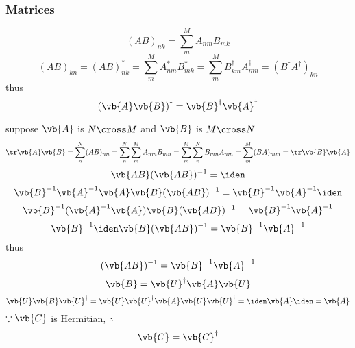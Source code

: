 \documentclass[a4paper]{article}
\begin{document}
\subsubsection{Matrices}
\begin{equation}\label{key}
(AB)_{nk} = \sum_m^M A_{nm}B_{mk}
\end{equation}
\begin{equation}\label{key}
(AB)^\dagger_{kn} = (AB)_{nk}^* = \sum_m^M A_{nm}^*B_{mk}^* = \sum_m^M B^\dagger_{km} A^\dagger_{mn} = (B^\dagger A^\dagger)_{kn}
\end{equation}
thus
\begin{equation}\label{key}
(\vb{A}\vb{B})^\dagger = \vb{B}^\dagger \vb{A}^\dagger
\end{equation}

suppose $ \vb{A} $ is $ N\cross M $ and $ \vb{B} $ is $ M\cross N $
\begin{equation}\label{key}
\tr \vb{A}\vb{B} = \sum_n^N (AB)_{nn} = \sum_n^N \sum_m^M A_{nm}B_{mn} = \sum_m^M\sum_n^N  B_{mn}A_{nm} = \sum_m^M (BA)_{mm} = \tr \vb{B}\vb{A}
\end{equation}
\begin{equation}\label{key}
\vb{AB}(\vb{AB})^{-1} = \iden
\end{equation}
\begin{equation}\label{key}
\vb{B}^{-1}\vb{A}^{-1}\vb{A}\vb{B}(\vb{AB})^{-1} = \vb{B}^{-1}\vb{A}^{-1}\iden
\end{equation}
\begin{equation}\label{key}
\vb{B}^{-1}(\vb{A}^{-1}\vb{A})\vb{B}(\vb{AB})^{-1} = \vb{B}^{-1}\vb{A}^{-1}
\end{equation}
\begin{equation}\label{key}
\vb{B}^{-1} \iden \vb{B}(\vb{AB})^{-1} = \vb{B}^{-1}\vb{A}^{-1}
\end{equation}
thus
\begin{equation}\label{key}
(\vb{AB})^{-1} = \vb{B}^{-1}\vb{A}^{-1}
\end{equation}
\begin{equation}\label{key}
\vb{B} = \vb{U}^\dagger \vb{A} \vb{U}
\end{equation}
\begin{equation}\label{key}
\vb{U} \vb{B} \vb{U}^\dagger = \vb{U} \vb{U}^\dagger \vb{A} \vb{U} \vb{U}^\dagger = \iden \vb{A} \iden = \vb{A}
\end{equation}
$ \because \vb{C}$ is Hermitian, $ \therefore $
\begin{equation}\label{key}
\vb{C} = \vb{C}^\dagger
\end{equation}
\end{document}
